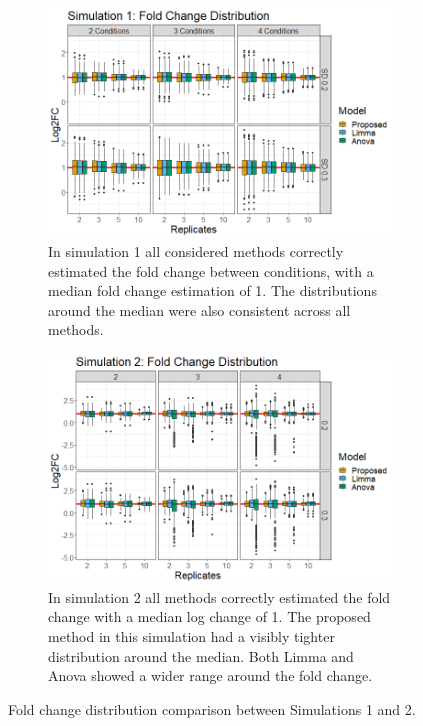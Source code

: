 \documentclass{mcp}
\begin{document}
\begin{figure}[h!]
\centering
 \begin{subfigure}{\textwidth}
 \centering
	\includegraphics[width=.8\textwidth]{sim_new/sim1_FC_boxplot}
	\caption{In simulation 1 all considered methods correctly estimated the fold change between conditions, with a median fold change estimation of 1. The distributions around the median were also consistent across all methods.}
 \end{subfigure}
 \begin{subfigure}{\textwidth}
  \centering
	\includegraphics[width=.8\textwidth]{sim_new/sim3_FC_boxplot}
	\caption{In simulation 2 all methods correctly estimated the fold change with a median log change of 1. The proposed method in this simulation had a visibly tighter distribution around the median. Both Limma and Anova showed a wider range around the fold change.}
 \end{subfigure}
\caption{Fold change distribution comparison between Simulations 1 and 2.}
\label{fig:fc_boxplot}
\end{figure}

\clearpage
\end{document}
